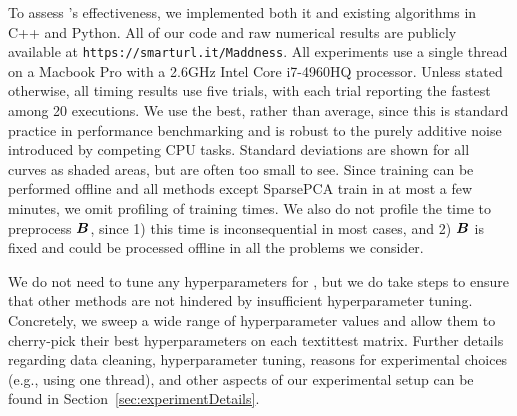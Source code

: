 
To assess \ours's effectiveness, we implemented both it and existing algorithms in C++ and Python. All of our code and raw numerical results are publicly available at \texttt{https://smarturl.it/Maddness}. All experiments use a single thread on a Macbook Pro with a 2.6GHz Intel Core i7-4960HQ processor. Unless stated otherwise, all timing results use five trials, with each trial reporting the fastest among 20 executions. We use the best, rather than average, since this is standard practice in performance benchmarking and is robust to the purely additive noise introduced by competing CPU tasks. Standard deviations are shown for all curves as shaded areas, but are often too small to see. Since training can be performed offline and all methods except SparsePCA \cite{sparsePCA} train in at most a few minutes, we omit profiling of training times. We also do not profile the time to preprocess $\bm{B}$, since 1) this time is inconsequential in most cases, and 2) $\bm{B}$ is fixed and could be processed offline in all the problems we consider.



We do not need to tune any hyperparameters for \ours, but we do take steps to ensure that other methods are not hindered by insufficient hyperparameter tuning. Concretely, we sweep a wide range of hyperparameter values and allow them to cherry-pick their best hyperparameters on each textit{test} matrix.
Further details regarding data cleaning, hyperparameter tuning, reasons for experimental choices (e.g., using one thread), and other aspects of our experimental setup can be found in Section~\ref{sec:experimentDetails}.


